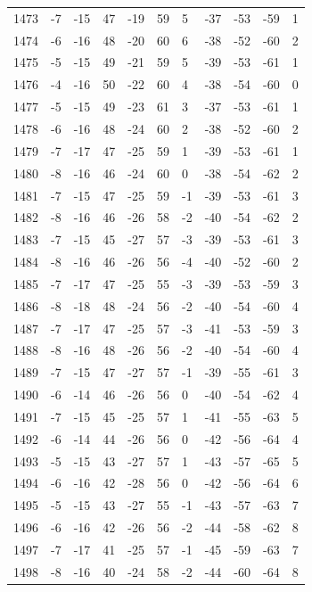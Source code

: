 \begin{table}[H]
\begin{tabular}{lllllllllll}
1473 & -7 & -15 & 47 & -19 & 59 & 5 & -37 & -53 & -59 & 1 \\
1474 & -6 & -16 & 48 & -20 & 60 & 6 & -38 & -52 & -60 & 2 \\
1475 & -5 & -15 & 49 & -21 & 59 & 5 & -39 & -53 & -61 & 1 \\
1476 & -4 & -16 & 50 & -22 & 60 & 4 & -38 & -54 & -60 & 0 \\
1477 & -5 & -15 & 49 & -23 & 61 & 3 & -37 & -53 & -61 & 1 \\
1478 & -6 & -16 & 48 & -24 & 60 & 2 & -38 & -52 & -60 & 2 \\
1479 & -7 & -17 & 47 & -25 & 59 & 1 & -39 & -53 & -61 & 1 \\
1480 & -8 & -16 & 46 & -24 & 60 & 0 & -38 & -54 & -62 & 2 \\
1481 & -7 & -15 & 47 & -25 & 59 & -1 & -39 & -53 & -61 & 3 \\
1482 & -8 & -16 & 46 & -26 & 58 & -2 & -40 & -54 & -62 & 2 \\
1483 & -7 & -15 & 45 & -27 & 57 & -3 & -39 & -53 & -61 & 3 \\
1484 & -8 & -16 & 46 & -26 & 56 & -4 & -40 & -52 & -60 & 2 \\
1485 & -7 & -17 & 47 & -25 & 55 & -3 & -39 & -53 & -59 & 3 \\
1486 & -8 & -18 & 48 & -24 & 56 & -2 & -40 & -54 & -60 & 4 \\
1487 & -7 & -17 & 47 & -25 & 57 & -3 & -41 & -53 & -59 & 3 \\
1488 & -8 & -16 & 48 & -26 & 56 & -2 & -40 & -54 & -60 & 4 \\
1489 & -7 & -15 & 47 & -27 & 57 & -1 & -39 & -55 & -61 & 3 \\
1490 & -6 & -14 & 46 & -26 & 56 & 0 & -40 & -54 & -62 & 4 \\
1491 & -7 & -15 & 45 & -25 & 57 & 1 & -41 & -55 & -63 & 5 \\
1492 & -6 & -14 & 44 & -26 & 56 & 0 & -42 & -56 & -64 & 4 \\
1493 & -5 & -15 & 43 & -27 & 57 & 1 & -43 & -57 & -65 & 5 \\
1494 & -6 & -16 & 42 & -28 & 56 & 0 & -42 & -56 & -64 & 6 \\
1495 & -5 & -15 & 43 & -27 & 55 & -1 & -43 & -57 & -63 & 7 \\
1496 & -6 & -16 & 42 & -26 & 56 & -2 & -44 & -58 & -62 & 8 \\
1497 & -7 & -17 & 41 & -25 & 57 & -1 & -45 & -59 & -63 & 7 \\
1498 & -8 & -16 & 40 & -24 & 58 & -2 & -44 & -60 & -64 & 8 \\

\end{tabular}
\end{table}

